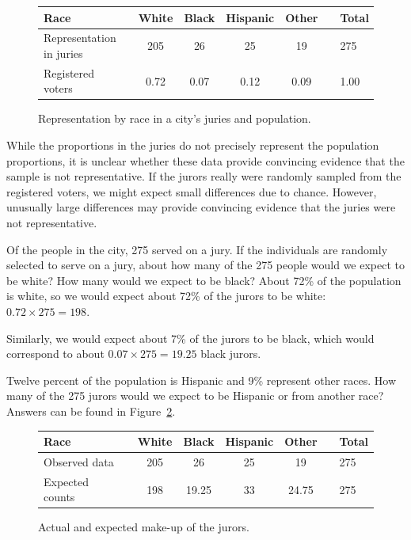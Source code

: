 \begin{figure}[h]
\centering
\begin{tabular}{ll ccc c ll}
\hline
Race	 & \hspace{2mm} & White & Black & Hispanic & Other & \hspace{2mm} & Total \\
\hline
Representation in juries &	& 205 & 26 & 25 & 19 & & 275 \\
Registered voters	 & 		& 0.72 & 0.07 & 0.12 & 0.09 & & 1.00 \\
\hline
\end{tabular}
\caption{Representation by race in a city's juries and population.}
\label{juryRepresentationAndCityRepresentationForRace}
\end{figure}

While the proportions in the juries do not precisely represent the population proportions, it is unclear whether these data provide convincing evidence that the sample is not representative. If the jurors really were randomly sampled from the registered voters, we might expect small differences due to chance. However, unusually large differences may provide convincing evidence that the juries were not representative.

\begin{examplewrap}
\begin{nexample}{Of the people in the city, 275 served on a jury. If the individuals are randomly selected to serve on a jury, about how many of the 275 people would we expect to be white? How many would we expect to be black?}
About 72\% of the population is white, so we would expect about 72\% of the jurors to be white: $0.72\times 275 = 198$.

Similarly, we would expect about 7\% of the jurors to be black, which would correspond to about $0.07\times 275 = 19.25$ black jurors.
\end{nexample}
\end{examplewrap}

\begin{exercisewrap}
\begin{nexercise}
Twelve percent of the population is Hispanic and 9\% represent other races. How many of the 275 jurors would we expect to be Hispanic or from another race? Answers can be found in Figure~\ref{expectedJuryRepresentationIfNoBias}.
\end{nexercise}
\end{exercisewrap}

\begin{figure}[h]
\centering
\begin{tabular}{ll ccc c ll}
\hline
Race	 & \hspace{2mm} & White & Black & Hispanic & Other & \hspace{2mm} & Total \\
\hline
Observed data			&	& 205 & 26	& 25 & 19	&	& 275 \\
Expected counts	 &	& 198 & 19.25 & 33 & 24.75 & & 275 \\
\hline
\end{tabular}
\caption{Actual and expected make-up of the jurors.}
\label{expectedJuryRepresentationIfNoBias}
\end{figure}

